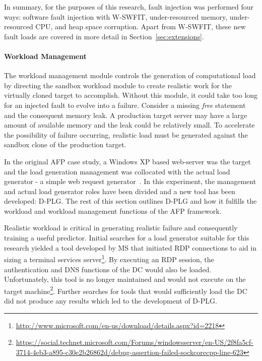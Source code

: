 \tabTranslationThirtyTwo
\tabTranslationSixtyFour

In summary, for the purposes of this research, fault injection was performed
four ways: software fault injection with \ac{W-SWFIT}, under-resourced memory,
under-resourced CPU, and heap space corruption.  Apart from \ac{W-SWFIT}, these
new fault loads are covered in more detail in Section~\ref{sec:extensions}.

\paragraph{Workload Management} \label{sec:workloadMgr} 
The workload management module controls the generation of computational load by
directing the sandbox workload module to create realistic work for the
virtually cloned target to accomplish.  Without this module, it could take too
long for an injected fault to evolve into a failure.  Consider a missing
\emph{free} statement and the consequent memory leak.  A production target
server may have a large amount of available memory and the leak could be
relatively small.  To accelerate the possibility of failure occurring,
realistic load must be generated against the sandbox clone of the production
target.

In the original \ac{AFP} case study, a Windows XP based web-server was the
target and the load generation management was collocated with the actual load
generator - a simple web request generator~\cite{irrera2015}.  In this
experiment, the management and actual load generator roles have been divided
and a new tool has been developed: \ac{D-PLG}.  The rest of this section
outlines \ac{D-PLG} and how it fulfills the workload and workload management
functions of the \ac{AFP} framework.

Realistic workload is critical in generating realistic failure and consequently
training a useful predictor.  Initial searches for a load generator suitable
for this research yielded a tool developed by \ac{MS} that initiated \ac{RDP}
connections to aid in sizing a terminal services
server\footnote{\url{http://www.microsoft.com/en-us/download/details.aspx?id=2218}}.
By executing an \ac{RDP} session, the authentication and \ac{DNS} functions of
the \ac{DC} would also be loaded.  Unfortunately, this tool is no longer
maintained and would not execute on the target
machine\footnote{\url{https://social.technet.microsoft.com/Forums/windowsserver/en-US/2f8fa5cf-3714-4eb3-a895-c30e2b26862d/debug-assertion-failed-sockcorecpp-line-623}}.
Further searches for tools that would sufficiently load the \ac{DC} did not
produce any results which led to the development of \ac{D-PLG}.

